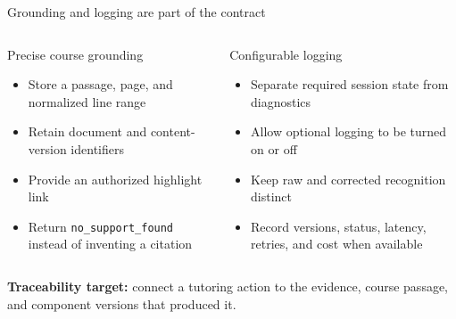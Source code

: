 \documentclass[aspectratio=169,10pt]{beamer}
\begin{document}
\begin{frame}{Grounding and logging are part of the contract}
\begin{columns}[T,onlytextwidth]
\begin{block}{Precise course grounding}
\begin{itemize}
\item Store a passage, page, and normalized line range
\item Retain document and content-version identifiers
\item Provide an authorized highlight link
\item Return \texttt{no\_support\_found} instead of inventing a citation
\end{itemize}
\end{block}
\begin{block}{Configurable logging}
\begin{itemize}
\item Separate required session state from diagnostics
\item Allow optional logging to be turned on or off
\item Keep raw and corrected recognition distinct
\item Record versions, status, latency, retries, and cost when available
\end{itemize}
\end{block}
\end{columns}
\vspace{.5em}
\centering
\textbf{Traceability target:} connect a tutoring action to the evidence, course passage, and component versions that produced it.
\end{frame}
\end{document}
